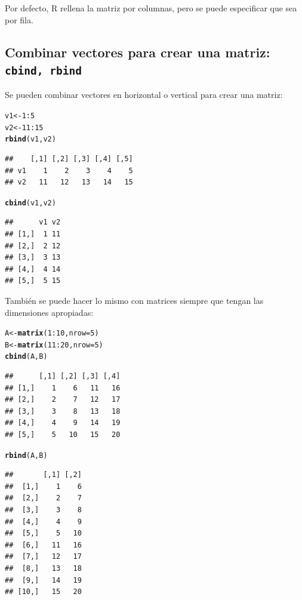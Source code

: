 \documentclass{config/apuntes}\usepackage[]{graphicx}\usepackage[]{xcolor}
\makeatletter
\newcommand{\hlnum}[1]{\textcolor[rgb]{0.686,0.059,0.569}{#1}}%
\newcommand{\hlopt}[1]{\textcolor[rgb]{0,0,0}{#1}}%
\newcommand{\hldef}[1]{\textcolor[rgb]{0.345,0.345,0.345}{#1}}%
\newcommand{\hlkwb}[1]{\textcolor[rgb]{0.69,0.353,0.396}{#1}}%
\newcommand{\hlkwc}[1]{\textcolor[rgb]{0.333,0.667,0.333}{#1}}%
\newcommand{\hlkwd}[1]{\textcolor[rgb]{0.737,0.353,0.396}{\textbf{#1}}}%
\newenvironment{kframe}{%
 \def\at@end@of@kframe{}%
 \ifinner\ifhmode%
  \def\at@end@of@kframe{\end{minipage}}%
  \begin{minipage}{\columnwidth}%
 \fi\fi%
 \def\FrameCommand##1{\hskip\@totalleftmargin \hskip-\fboxsep
 \colorbox{shadecolor}{##1}\hskip-\fboxsep
     \hskip-\linewidth \hskip-\@totalleftmargin \hskip\columnwidth}%
 \MakeFramed {\advance\hsize-\width
   \@totalleftmargin\z@ \linewidth\hsize
   \@setminipage}}%
 {\par\unskip\endMakeFramed%
 \at@end@of@kframe}
\newenvironment{knitrout}{}{} %
\newcommand{\code}[1]{\texttt{#1}}
\makeatother
\begin{document}
Por defecto, R rellena la matriz por columnas, pero se puede especificar que sea por fila. 

\subsection{Combinar vectores para crear una matriz: \code{cbind, rbind}}
Se pueden combinar vectores en horizontal o vertical para crear una matriz:
\begin{knitrout}
\color{fgcolor}\begin{kframe}
\begin{alltt}
\hldef{v1} \hlkwb{<-} \hlnum{1}\hlopt{:}\hlnum{5}
\hldef{v2} \hlkwb{<-} \hlnum{11}\hlopt{:}\hlnum{15}
\hlkwd{rbind}\hldef{(v1, v2)}
\end{alltt}
\begin{verbatim}
##    [,1] [,2] [,3] [,4] [,5]
## v1    1    2    3    4    5
## v2   11   12   13   14   15
\end{verbatim}
\begin{alltt}
\hlkwd{cbind}\hldef{(v1, v2)}
\end{alltt}
\begin{verbatim}
##      v1 v2
## [1,]  1 11
## [2,]  2 12
## [3,]  3 13
## [4,]  4 14
## [5,]  5 15
\end{verbatim}
\end{kframe}
\end{knitrout}

También se puede hacer lo mismo con matrices siempre que tengan las dimensiones apropiadas:
\begin{knitrout}
\color{fgcolor}\begin{kframe}
\begin{alltt}
\hldef{A} \hlkwb{<-} \hlkwd{matrix}\hldef{(}\hlnum{1}\hlopt{:}\hlnum{10}\hldef{,} \hlkwc{nrow} \hldef{=} \hlnum{5}\hldef{)}
\hldef{B} \hlkwb{<-} \hlkwd{matrix}\hldef{(}\hlnum{11}\hlopt{:}\hlnum{20}\hldef{,} \hlkwc{nrow} \hldef{=} \hlnum{5}\hldef{)}
\hlkwd{cbind}\hldef{(A, B)}
\end{alltt}
\begin{verbatim}
##      [,1] [,2] [,3] [,4]
## [1,]    1    6   11   16
## [2,]    2    7   12   17
## [3,]    3    8   13   18
## [4,]    4    9   14   19
## [5,]    5   10   15   20
\end{verbatim}
\begin{alltt}
\hlkwd{rbind}\hldef{(A, B)}
\end{alltt}
\begin{verbatim}
##       [,1] [,2]
##  [1,]    1    6
##  [2,]    2    7
##  [3,]    3    8
##  [4,]    4    9
##  [5,]    5   10
##  [6,]   11   16
##  [7,]   12   17
##  [8,]   13   18
##  [9,]   14   19
## [10,]   15   20
\end{verbatim}
\end{kframe}
\end{knitrout}
\end{document}
